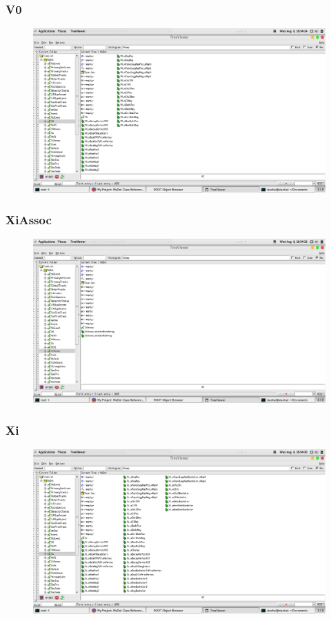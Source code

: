 \documentclass[10pt]{beamer}
\begin{document}
\label{V0}
\begin{frame}
  \frametitle{V0}
  \begin{figure}[hbtp]
    \centering
    \includegraphics[width=\textwidth]{V0.png}
  \end{figure}
\end{frame}
\label{XiAssoc}
\begin{frame}
  \frametitle{XiAssoc}
  \begin{figure}[hbtp]
    \centering
    \includegraphics[width=\textwidth]{XiAssoc.png}
  \end{figure}
\end{frame}
\label{Xi}
\begin{frame}
  \frametitle{Xi}
  \begin{figure}[hbtp]
    \centering
    \includegraphics[width=\textwidth]{Xi.png}
  \end{figure}
\end{frame}
\end{document}
